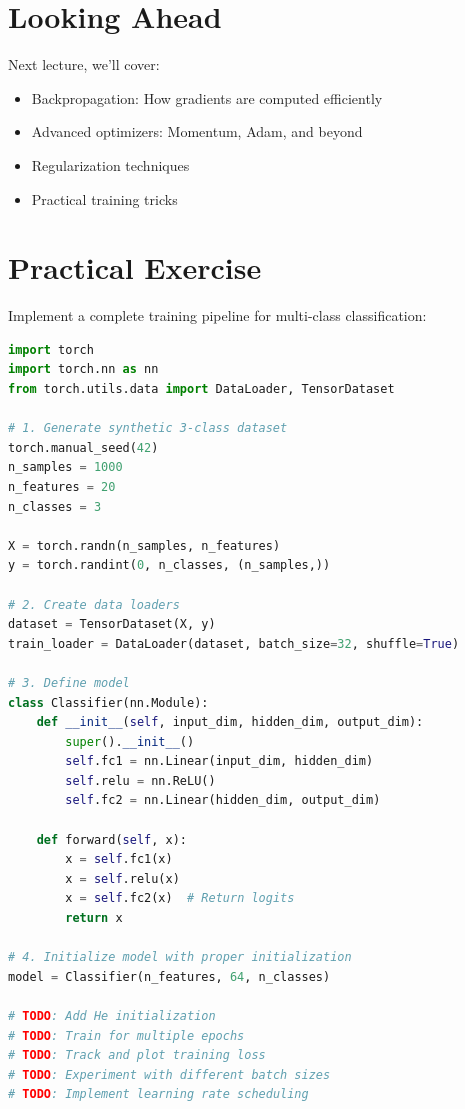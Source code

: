 \documentclass{article}
\begin{document}
\section{Looking Ahead}

Next lecture, we'll cover:
\begin{itemize}
\item Backpropagation: How gradients are computed efficiently
\item Advanced optimizers: Momentum, Adam, and beyond
\item Regularization techniques
\item Practical training tricks
\end{itemize}

\section{Practical Exercise}

Implement a complete training pipeline for multi-class classification:

\begin{lstlisting}[language=Python, caption=Exercise template]
import torch
import torch.nn as nn
from torch.utils.data import DataLoader, TensorDataset

# 1. Generate synthetic 3-class dataset
torch.manual_seed(42)
n_samples = 1000
n_features = 20
n_classes = 3

X = torch.randn(n_samples, n_features)
y = torch.randint(0, n_classes, (n_samples,))

# 2. Create data loaders
dataset = TensorDataset(X, y)
train_loader = DataLoader(dataset, batch_size=32, shuffle=True)

# 3. Define model
class Classifier(nn.Module):
    def __init__(self, input_dim, hidden_dim, output_dim):
        super().__init__()
        self.fc1 = nn.Linear(input_dim, hidden_dim)
        self.relu = nn.ReLU()
        self.fc2 = nn.Linear(hidden_dim, output_dim)
    
    def forward(self, x):
        x = self.fc1(x)
        x = self.relu(x)
        x = self.fc2(x)  # Return logits
        return x

# 4. Initialize model with proper initialization
model = Classifier(n_features, 64, n_classes)

# TODO: Add He initialization
# TODO: Train for multiple epochs
# TODO: Track and plot training loss
# TODO: Experiment with different batch sizes
# TODO: Implement learning rate scheduling
\end{lstlisting}
\end{document}
